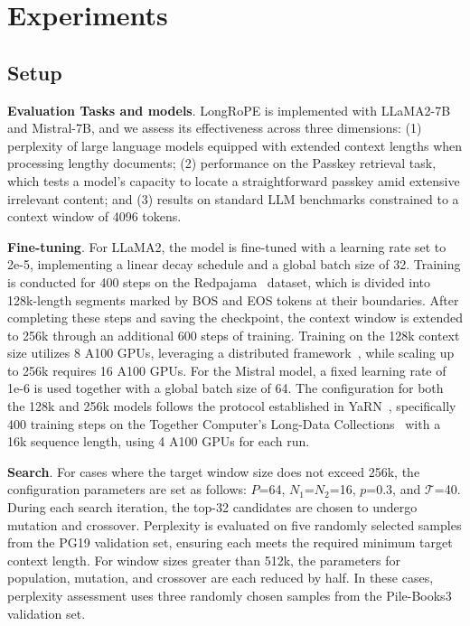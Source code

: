  \section{Experiments}

\label{sec:exp}
\subsection{Setup}
\textbf{Evaluation Tasks and models}. LongRoPE is implemented with LLaMA2-7B and Mistral-7B, and we assess its effectiveness across three dimensions: (1) perplexity of large language models equipped with extended context lengths when processing lengthy documents; (2) performance on the Passkey retrieval task, which tests a model’s capacity to locate a straightforward passkey amid extensive irrelevant content; and (3) results on standard LLM benchmarks constrained to a context window of 4096 tokens.

\textbf{Fine-tuning}. For LLaMA2, the model is fine-tuned with a learning rate set to 2e-5, implementing a linear decay schedule and a global batch size of 32. Training is conducted for 400 steps on the Redpajama~\cite{redpajama} dataset, which is divided into 128k-length segments marked by BOS and EOS tokens at their boundaries. After completing these steps and saving the checkpoint, the context window is extended to 256k through an additional 600 steps of training. Training on the 128k context size utilizes 8 A100 GPUs, leveraging a distributed framework~\cite{cube}, while scaling up to 256k requires 16 A100 GPUs. For the Mistral model, a fixed learning rate of 1e-6 is used together with a global batch size of 64. The configuration for both the 128k and 256k models follows the protocol established in YaRN~\cite{yarn}, specifically 400 training steps on the Together Computer's Long-Data Collections~\cite{mistraldata} with a 16k sequence length, using 4 A100 GPUs for each run.

\textbf{Search}. For cases where the target window size does not exceed 256k, the configuration parameters are set as follows: $P$=64, $N_1$=$N_2$=16, $p$=0.3, and $\mathcal{T}$=40. During each search iteration, the top-32 candidates are chosen to undergo mutation and crossover. Perplexity is evaluated on five randomly selected samples from the PG19 validation set, ensuring each meets the required minimum target context length. For window sizes greater than 512k, the parameters for population, mutation, and crossover are each reduced by half. In these cases, perplexity assessment uses three randomly chosen samples from the Pile-Books3~\cite{pile} validation set.

